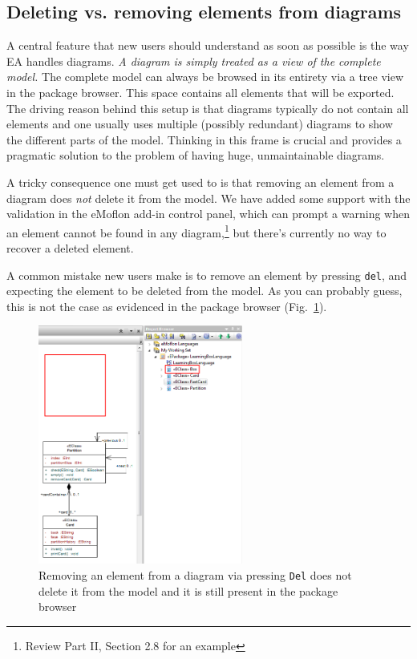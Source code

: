 \subsection{Deleting vs. removing elements from diagrams} 

A central feature that new users should understand as soon as possible is the way EA handles diagrams. \emph{A diagram is simply treated as a \emph{view} of the
complete model.} The complete model can always be browsed in its entirety via a tree view in the package browser. This space contains all elements that will be
exported. The driving reason behind this setup is that diagrams typically do not contain all elements and one usually uses multiple (possibly redundant)
diagrams to show the different parts of the model. Thinking in this frame is crucial and provides a pragmatic solution to the problem of having huge,
unmaintainable diagrams.

A tricky consequence one must get used to is that removing an element from a diagram does \emph{not} delete it from the model. We have added some support
with the validation in the eMoflon add-in control panel, which can prompt a warning when an element cannot be found in any diagram,\footnote{Review Part II,
Section 2.8 for an example} but there's currently no way to recover a deleted element.

A common mistake new users make is to remove an element by pressing \texttt{del}, and expecting the element to be deleted from the model. As you can probably
guess, this is not the case as evidenced in the package browser (Fig.~\ref{ea:partiallyDeleted}).

\vspace{0.5cm}

\begin{figure}[htbp]
\begin{center} 
\includegraphics[width=0.6\textwidth]{ea_partiallyDeleted}
  \caption{Removing an element from a diagram via pressing \texttt{Del} does not delete it from the model and it is still present in the package browser}  
    \label{ea:partiallyDeleted}
\end{center}
\end{figure}  

